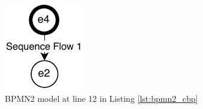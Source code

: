 \documentclass[conference]{IEEEtran}
\begin{document}
\begin{figure}
  \begin{subfigure}[t]{0.2\linewidth}
    \centering
    \includegraphics[width=\linewidth]{bpmn2_12}
    \caption{BPMN2 model at line 12 in Listing \ref{lst:bpmn2_cbp}}
    \label{fig:bpmn2_12}
  \end{subfigure}
  \hfill
  \begin{subfigure}[t]{0.2\linewidth}
    \centering

\end{subfigure}
\end{figure}
\end{document}
